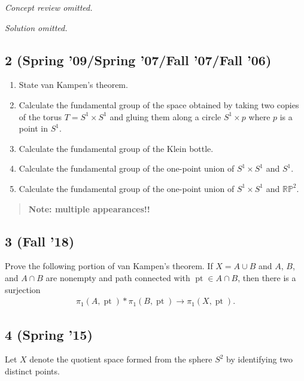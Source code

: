 \emph{Concept review omitted.}

\emph{Solution omitted.}

\hypertarget{spring-09spring-07fall-07fall-06}{%
\subsection{2 (Spring '09/Spring '07/Fall '07/Fall
'06)}\label{spring-09spring-07fall-07fall-06}}

\begin{enumerate}
\def\labelenumi{\alph{enumi}.}
\item
  State van Kampen's theorem.
\item
  Calculate the fundamental group of the space obtained by taking two
  copies of the torus \(T = S^1 \times S^1\) and gluing them along a
  circle \(S^1 \times {p}\) where \(p\) is a point in \(S^1\).
\item
  Calculate the fundamental group of the Klein bottle.
\item
  Calculate the fundamental group of the one-point union of
  \(S^1 \times S^1\) and \(S^1\).
\item
  Calculate the fundamental group of the one-point union of
  \(S^1 \times S^1\) and \({\mathbb{RP}}^2\).
\end{enumerate}

\begin{quote}
\textbf{Note: multiple appearances!!}
\end{quote}

\hypertarget{fall-18-2}{%
\subsection{3 (Fall '18)}\label{fall-18-2}}

Prove the following portion of van Kampen's theorem. If \(X = A\cup B\)
and \(A\), \(B\), and \(A \cap B\) are nonempty and path connected with
\({\operatorname{pt}}\in A \cap B\), then there is a surjection
\begin{align*}
\pi_1 (A, {\operatorname{pt}}) \ast \pi_1 (B, {\operatorname{pt}}) \to \pi_1 (X, {\operatorname{pt}})
.\end{align*}

\hypertarget{spring-15-4}{%
\subsection{4 (Spring '15)}\label{spring-15-4}}

Let \(X\) denote the quotient space formed from the sphere \(S^2\) by
identifying two distinct points.

